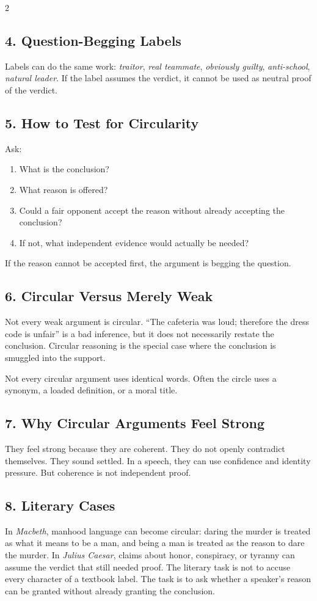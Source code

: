 \documentclass[12pt]{article}
\begin{document}
\begin{multicols}{2}
\subsection*{4. Question-Begging Labels}
Labels can do the same work: \textit{traitor}, \textit{real teammate}, \textit{obviously guilty}, \textit{anti-school}, \textit{natural leader}. If the label assumes the verdict, it cannot be used as neutral proof of the verdict.

\subsection*{5. How to Test for Circularity}
Ask:
\begin{enumerate}[leftmargin=*,itemsep=0.12em]
\item What is the conclusion?
\item What reason is offered?
\item Could a fair opponent accept the reason without already accepting the conclusion?
\item If not, what independent evidence would actually be needed?
\end{enumerate}
If the reason cannot be accepted first, the argument is begging the question.

\subsection*{6. Circular Versus Merely Weak}
Not every weak argument is circular. ``The cafeteria was loud; therefore the dress code is unfair'' is a bad inference, but it does not necessarily restate the conclusion. Circular reasoning is the special case where the conclusion is smuggled into the support.

Not every circular argument uses identical words. Often the circle uses a synonym, a loaded definition, or a moral title.

\subsection*{7. Why Circular Arguments Feel Strong}
They feel strong because they are coherent. They do not openly contradict themselves. They sound settled. In a speech, they can use confidence and identity pressure. But coherence is not independent proof.

\subsection*{8. Literary Cases}
In \textit{Macbeth}, manhood language can become circular: daring the murder is treated as what it means to be a man, and being a man is treated as the reason to dare the murder. In \textit{Julius Caesar}, claims about honor, conspiracy, or tyranny can assume the verdict that still needed proof. The literary task is not to accuse every character of a textbook label. The task is to ask whether a speaker's reason can be granted without already granting the conclusion.


\end{multicols}
\end{document}
